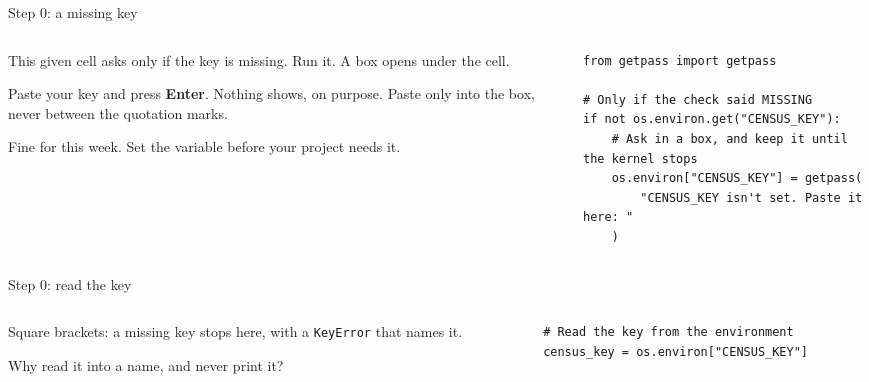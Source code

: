 \documentclass[9pt,aspectratio=169]{beamer}
\begin{document}
\begin{frame}[fragile]{Step 0: a missing key}
    \begin{columns}[T]
        \begin{column}{0.37\textwidth}
            This given cell asks only if the key is missing. Run it. A box opens under the cell.

            \medskip
            Paste your key and press \textbf{Enter}. Nothing shows, on purpose. Paste only into the box, never between the quotation marks.

            \medskip
            Fine for this week. Set the variable before your project needs it.
        \end{column}
        \begin{column}{0.6\textwidth}
\begin{lstlisting}
from getpass import getpass

# Only if the check said MISSING
if not os.environ.get("CENSUS_KEY"):
    # Ask in a box, and keep it until the kernel stops
    os.environ["CENSUS_KEY"] = getpass(
        "CENSUS_KEY isn't set. Paste it here: "
    )
\end{lstlisting}
        \end{column}
    \end{columns}
\end{frame}

\begin{frame}[fragile]{Step 0: read the key}
    \begin{columns}[T]
        \begin{column}{0.37\textwidth}
            Square brackets: a missing key stops here, with a \texttt{KeyError} that names it.

            \medskip
            Why read it into a name, and never print it?
        \end{column}
        \begin{column}{0.6\textwidth}
\begin{lstlisting}
# Read the key from the environment
census_key = os.environ["CENSUS_KEY"]
\end{lstlisting}
        \end{column}
    \end{columns}
\end{frame}
\end{document}
